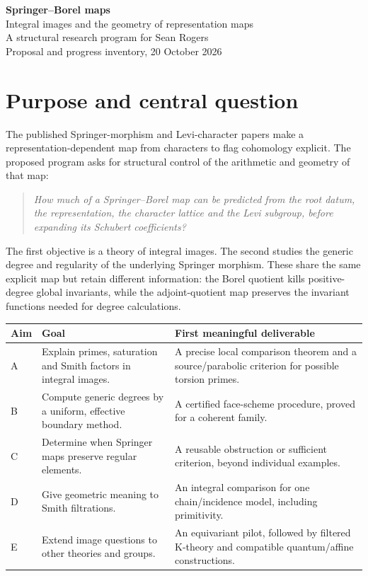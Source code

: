 \documentclass[11pt,letterpaper]{article}
\begin{document}
\begin{center}
{\LARGE\bfseries Springer--Borel maps}\\[5pt]
{\Large Integral images and the geometry of representation maps}\\[7pt]
{\normalsize A structural research program for Sean Rogers}\\[3pt]
{\small Proposal and progress inventory, 20 October 2026}
\end{center}

\section*{Purpose and central question}
The published Springer-morphism and Levi-character papers make a
representation-dependent map from characters to flag cohomology explicit.
The proposed program asks for structural control of the arithmetic and
geometry of that map:
\begin{quote}
\emph{How much of a Springer--Borel map can be predicted from the root datum,
the representation, the character lattice and the Levi subgroup, before
expanding its Schubert coefficients?}
\end{quote}
The first objective is a theory of integral images. The second studies the
generic degree and regularity of the underlying Springer morphism. These
share the same explicit map but retain different information: the Borel
quotient kills positive-degree global invariants, while the adjoint-quotient
map preserves the invariant functions needed for degree calculations.

\noindent\begin{tabularx}{\linewidth}{@{}p{0.45in}YY@{}}
\toprule
Aim & Goal & First meaningful deliverable\\
\midrule
A & Explain primes, saturation and Smith factors in integral images.
& A precise local comparison theorem and a source/parabolic criterion
for possible torsion primes.\\
B & Compute generic degrees by a uniform, effective boundary method.
& A certified face-scheme procedure, proved for a coherent family.\\
C & Determine when Springer maps preserve regular elements.
& A reusable obstruction or sufficient criterion, beyond individual examples.\\
D & Give geometric meaning to Smith filtrations.
& An integral comparison for one chain/incidence model, including primitivity.\\
E & Extend image questions to other theories and groups.
& An equivariant pilot, followed by filtered K-theory and compatible
quantum/affine constructions.\\
\bottomrule
\end{tabularx}
\end{document}

